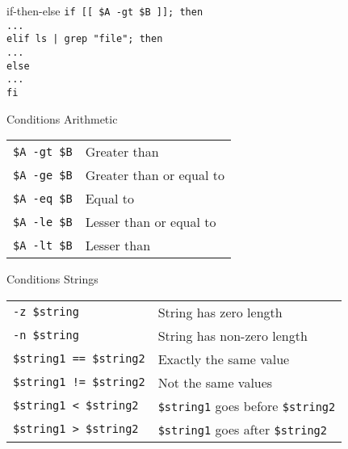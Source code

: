 \documentclass{beamer}
\let\tt\texttt
\begin{document}
\begin{frame}{if-then-else}
        \tt{if [[ \$A -gt \$B ]]; then}   \\
        \quad \tt{...}                  \\
        \tt{elif ls | grep "file"; then}\\
        \quad \tt{...}                  \\
        \tt{else}                       \\
        \quad \tt{...}                  \\
        \tt{fi}                         \\
\end{frame}

\begin{frame}{Conditions}
        Arithmetic \\
        \begin{tabular}{l l}
                \tt{\$A -gt \$B}    &   Greater than                \\
                \tt{\$A -ge \$B}    &   Greater than or equal to    \\
                \tt{\$A -eq \$B}    &   Equal to                    \\
                \tt{\$A -le \$B}    &   Lesser than or equal to     \\
                \tt{\$A -lt \$B}    &   Lesser than                 \\
        \end{tabular}
\end{frame}

\begin{frame}{Conditions}
        Strings    \\
        \begin{tabular}{l l}
                \tt{-z \$string}    &   String has zero length      \\
                \tt{-n \$string}    &   String has non-zero length  \\
                \tt{\$string1 == \$string2}    &   Exactly the same value   \\
                \tt{\$string1 != \$string2}    &   Not the same values      \\
                \tt{\$string1 < \$string2}     &   \tt{\$string1} goes before \tt{\$string2} \\
                \tt{\$string1 > \$string2}     &   \tt{\$string1} goes after \tt{\$string2} \\
        \end{tabular}
\end{frame}
\end{document}
